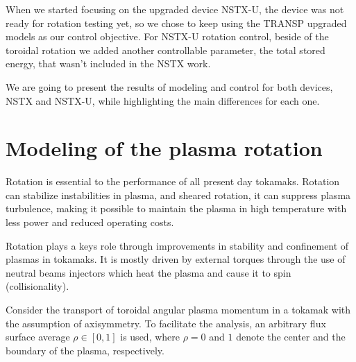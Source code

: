 \documentclass[12pt,lot, lof]{puthesis}
\begin{document}
When we started focusing on the upgraded device NSTX-U, the device was not ready for rotation testing yet, so we chose to keep using the TRANSP upgraded models as our control objective.
For NSTX-U rotation control, beside of the toroidal rotation we added another controllable parameter, the total stored energy, that wasn't included in the NSTX work. 

We are going to present the results of modeling and control for both devices, NSTX and NSTX-U, while highlighting the main differences for each one.

\section{Modeling of the plasma rotation}

Rotation is essential to the performance of all present day tokamaks. Rotation can stabilize instabilities in plasma, and sheared rotation, it can suppress plasma turbulence, making it possible to maintain the plasma in high temperature with less power and reduced operating costs. 

Rotation plays a keys role through improvements in stability and confinement of plasmas in tokamaks. It is mostly driven by external torques through the use of neutral beams injectors which heat the plasma and cause it to spin (collisionality).

Consider the transport of toroidal angular plasma momentum in a tokamak with the assumption of axisymmetry.  To facilitate the analysis, an arbitrary flux surface average $\rho \in [0,1]$ is used, where $\rho = 0$ and $1$ denote the center and the boundary of the plasma, respectively.  
\end{document}
